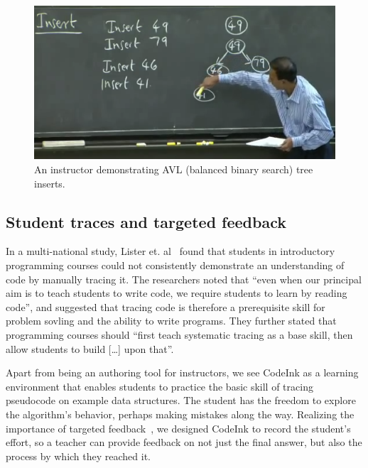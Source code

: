 \begin{figure}

\begin{center}
\includegraphics[width=0.7\columnwidth]{img/6006/bst.png}
\end{center}

\caption{An instructor demonstrating AVL (balanced binary search) tree
inserts.}

\label{fig:6006-bst}
\end{figure}

\subsection{Student traces and targeted feedback}
In a multi-national study, Lister et. al~\cite{Lister2004} found that students
in introductory programming courses could not consistently demonstrate an
understanding of code by manually tracing it. The researchers noted that ``even
when our principal aim is to teach students to write code, we require students
to learn by reading code'', and suggested that tracing code is therefore a
prerequisite skill for problem sovling and the ability to write programs. They
further stated that programming courses should ``first teach systematic tracing
as a base skill, then allow students to build [\ldots] upon that''.

Apart from being an authoring tool for instructors, we see CodeInk as a learning
environment that enables students to practice the basic skill of tracing
pseudocode on example data structures. The student has the freedom to explore
the algorithm's behavior, perhaps making mistakes along the way.
Realizing the importance of targeted feedback~\cite{Balzer1989}, we designed
CodeInk to record the student's effort, so a teacher can provide feedback on not
just the final answer, but also the process by which they reached it.



